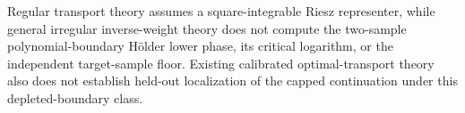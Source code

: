 Regular transport theory assumes a square-integrable Riesz representer, while general irregular inverse-weight theory does not compute the two-sample polynomial-boundary Hölder lower phase, its critical logarithm, or the independent target-sample floor. Existing calibrated optimal-transport theory also does not establish held-out localization of the capped continuation under this depleted-boundary class.